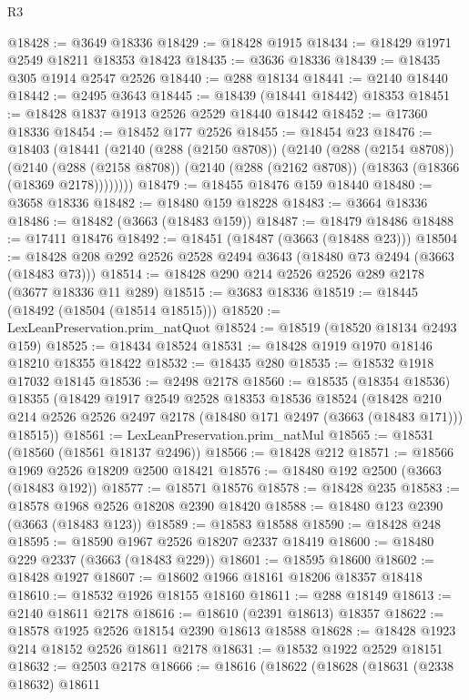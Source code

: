 \begin{lexlean}{R3}
\begin{coremodule}
@18428 := @3649 @18336
@18429 := @18428 @1915
@18434 := @18429 @1971 @2549 @18211 @18353 @18423
@18435 := @3636 @18336
@18439 := @18435 @305 @1914 @2547 @2526
@18440 := @288 @18134
@18441 := @2140 @18440
@18442 := @2495 @3643
@18445 := @18439 (@18441 @18442) @18353
@18451 := @18428 @1837 @1913 @2526 @2529 @18440 @18442
@18452 := @17360 @18336
@18454 := @18452 @177 @2526
@18455 := @18454 @23
@18476 := @18403
    (@18441
      (@2140
        (@288 (@2150 @8708))
        (@2140
          (@288 (@2154 @8708))
          (@2140
            (@288 (@2158 @8708))
            (@2140 (@288 (@2162 @8708)) (@18363 (@18366 (@18369 @2178))))))))
@18479 := @18455 @18476 @159 @18440
@18480 := @3658 @18336
@18482 := @18480 @159 @18228
@18483 := @3664 @18336
@18486 := @18482 (@3663 (@18483 @159))
@18487 := @18479 @18486
@18488 := @17411 @18476
@18492 := @18451 (@18487 (@3663 (@18488 @23)))
@18504 := @18428 @208 @292 @2526 @2528 @2494 @3643 (@18480 @73 @2494 (@3663 (@18483 @73)))
@18514 := @18428 @290 @214 @2526 @2526 @289 @2178 (@3677 @18336 @11 @289)
@18515 := @3683 @18336
@18519 := @18445 (@18492 (@18504 (@18514 @18515)))
@18520 := LexLeanPreservation.prim_natQuot
@18524 := @18519 (@18520 @18134 @2493 @159)
@18525 := @18434 @18524
@18531 := @18428 @1919 @1970 @18146 @18210 @18355 @18422
@18532 := @18435 @280
@18535 := @18532 @1918 @17032 @18145
@18536 := @2498 @2178
@18560 := @18535
    (@18354 @18536)
    @18355
    (@18429
      @1917
      @2549
      @2528
      @18353
      @18536
      @18524
      (@18428 @210 @214 @2526 @2526 @2497 @2178 (@18480 @171 @2497 (@3663 (@18483 @171))) @18515))
@18561 := LexLeanPreservation.prim_natMul
@18565 := @18531 (@18560 (@18561 @18137 @2496))
@18566 := @18428 @212
@18571 := @18566 @1969 @2526 @18209 @2500 @18421
@18576 := @18480 @192 @2500 (@3663 (@18483 @192))
@18577 := @18571 @18576
@18578 := @18428 @235
@18583 := @18578 @1968 @2526 @18208 @2390 @18420
@18588 := @18480 @123 @2390 (@3663 (@18483 @123))
@18589 := @18583 @18588
@18590 := @18428 @248
@18595 := @18590 @1967 @2526 @18207 @2337 @18419
@18600 := @18480 @229 @2337 (@3663 (@18483 @229))
@18601 := @18595 @18600
@18602 := @18428 @1927
@18607 := @18602 @1966 @18161 @18206 @18357 @18418
@18610 := @18532 @1926 @18155 @18160
@18611 := @288 @18149
@18613 := @2140 @18611 @2178
@18616 := @18610 (@2391 @18613) @18357
@18622 := @18578 @1925 @2526 @18154 @2390 @18613 @18588
@18628 := @18428 @1923 @214 @18152 @2526 @18611 @2178
@18631 := @18532 @1922 @2529 @18151
@18632 := @2503 @2178
@18666 := @18616
    (@18622
      (@18628
        (@18631
          (@2338 @18632)
          @18611

\end{coremodule}
\end{lexlean}
